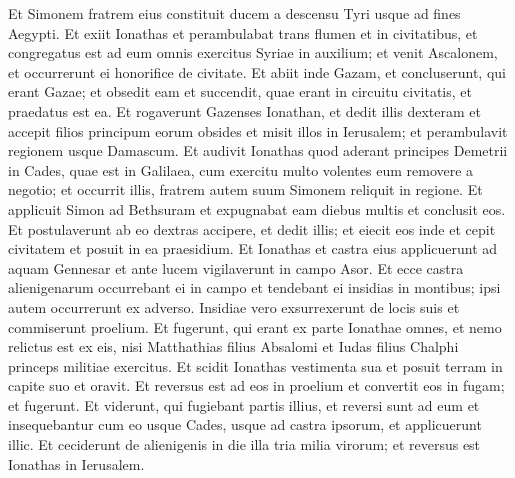 \begin{biblechapter}
\begin{biblechapter}
\begin{biblechapter}
\begin{biblechapter}
\begin{biblechapter}
\begin{biblechapter}
\begin{biblechapter}
\begin{biblechapter}
\begin{biblechapter}
\begin{biblechapter}
\begin{biblechapter}
\verse Et Simonem fratrem eius constituit ducem a descensu Tyri usque ad fines Aegypti. 
\verse Et exiit Ionathas et perambulabat trans flumen et in civitatibus, et congregatus est ad eum omnis exercitus Syriae in auxilium; et venit Ascalonem, et occurrerunt ei honorifice de civitate. 
\verse Et abiit inde Gazam, et concluserunt, qui erant Gazae; et obsedit eam et succendit, quae erant in circuitu civitatis, et praedatus est ea. 
\verse Et rogaverunt Gazenses Ionathan, et dedit illis dexteram et accepit filios principum eorum obsides et misit illos in Ierusalem; et perambulavit regionem usque Damascum. 
\verse Et audivit Ionathas quod aderant principes Demetrii in Cades, quae est in Galilaea, cum exercitu multo volentes eum removere a negotio; 
\verse et occurrit illis, fratrem autem suum Simonem reliquit in regione. 
\verse Et applicuit Simon ad Bethsuram et expugnabat eam diebus multis et conclusit eos. 
\verse Et postulaverunt ab eo dextras accipere, et dedit illis; et eiecit eos inde et cepit civitatem et posuit in ea praesidium.
 \verse Et Ionathas et castra eius applicuerunt ad aquam Gennesar et ante lucem vigilaverunt in campo Asor. 
\verse Et ecce castra alienigenarum occurrebant ei in campo et tendebant ei insidias in montibus; ipsi autem occurrerunt ex adverso. 
\verse Insidiae vero exsurrexerunt de locis suis et commiserunt proelium. 
\verse Et fugerunt, qui erant ex parte Ionathae omnes, et nemo relictus est ex eis, nisi Matthathias filius Absalomi et Iudas filius Chalphi princeps militiae exercitus. 
\verse Et scidit Ionathas vestimenta sua et posuit terram in capite suo et oravit. 
\verse Et reversus est ad eos in proelium et convertit eos in fugam; et fugerunt. 
\verse Et viderunt, qui fugiebant partis illius, et reversi sunt ad eum et insequebantur cum eo usque Cades, usque ad castra ipsorum, et applicuerunt illic. 
\verse Et ceciderunt de alienigenis in die illa tria milia virorum; et reversus est Ionathas in Ierusalem.
 

\end{biblechapter}
\end{biblechapter}
\end{biblechapter}
\end{biblechapter}
\end{biblechapter}
\end{biblechapter}
\end{biblechapter}
\end{biblechapter}
\end{biblechapter}
\end{biblechapter}
\end{biblechapter}
